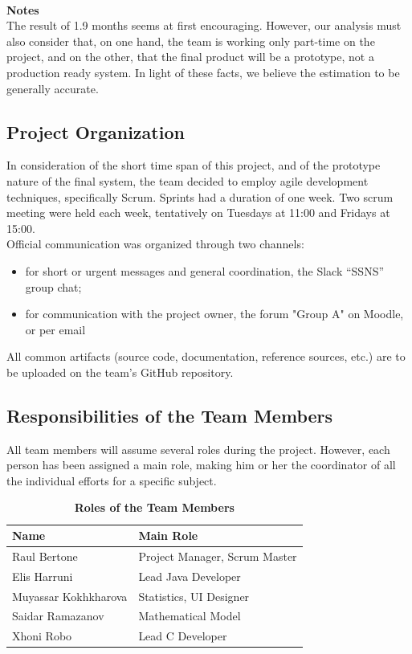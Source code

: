 \documentclass[conference,12pt]{IEEETran}
\begin{document}
\textbf{\\Notes}
\\The result of 1.9 months seems at first encouraging. However, our 
analysis must also consider that, on one hand, the team is working only 
part-time on the project, and on the other, that the final product will 
be a prototype, not a production ready system. In light of these facts, 
we believe the estimation to be generally accurate.

\subsection{Project Organization}

	In consideration of the short time span of this project, and of the prototype nature of the final system, the team decided to employ agile development techniques, specifically Scrum. Sprints had a duration of one week. Two scrum meeting were held each week, tentatively on Tuesdays at 11:00 and Fridays at 15:00.\\
	Official communication was organized through two channels:
	\begin{itemize}
		\item for short or urgent messages and general coordination, the Slack “SSNS” group chat;
		\item for communication with the project owner, the forum "Group A" on Moodle, or per email
	\end{itemize}
	All common artifacts (source code, documentation, reference sources, etc.) are to be uploaded on the team’s GitHub repository.


\subsection{Responsibilities of the Team Members}

All team members will assume several roles during the project. However, each person has been assigned a main role, making him or her the coordinator of all the individual efforts for a specific subject. 

\begin{table}[h]
\centering
\caption{\textbf{Roles of the Team Members}}
{\renewcommand{\arraystretch}{2}%
\begin{tabular}{ | l | l | }
\hline
\textbf{Name} & \textbf{Main Role} \\ \hline
Raul Bertone & Project Manager, Scrum Master \\ \hline
Elis Harruni & Lead Java Developer \\ \hline
Muyassar Kokhkharova & Statistics, UI Designer \\ \hline
Saidar Ramazanov & Mathematical Model \\ \hline
Xhoni Robo & Lead C Developer \\ \hline
\end{tabular}}
\end{table} 
\end{document}
